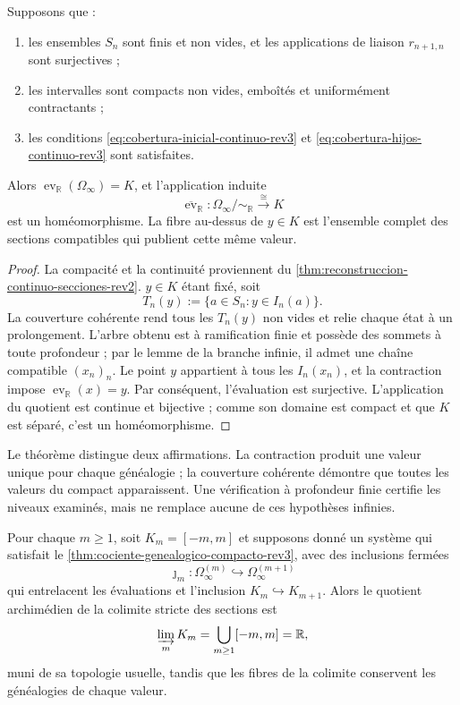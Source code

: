 \begin{theorem}
\label{thm:cociente-genealogico-compacto-rev3}
Supposons que :
\begin{enumerate}
\item les ensembles \(S_n\) sont finis et non vides, et les applications de liaison
      \(r_{n+1,n}\) sont surjectives ;
\item les intervalles sont compacts non vides, emboîtés et uniformément
      contractants ;
\item les conditions
      \eqref{eq:cobertura-inicial-continuo-rev3} et
      \eqref{eq:cobertura-hijos-continuo-rev3} sont satisfaites.
\end{enumerate}
Alors \(\operatorname{ev}_{\mathbb R}(\Omega_\infty)=K\), et l'application
induite
\begin{equation}
 \overline{\operatorname{ev}}_{\mathbb R}:
 \Omega_\infty/\!\sim_{\mathbb R}\xrightarrow{\ \cong\ }K
 \label{eq:homeomorfismo-cociente-continuo-rev3}
\end{equation}
est un homéomorphisme. La fibre au-dessus de \(y\in K\) est l'ensemble complet des
sections compatibles qui publient cette même valeur.
\end{theorem}

\begin{proof}
La compacité et la continuité proviennent du
\cref{thm:reconstruccion-continuo-secciones-rev2}. \(y\in K\) étant fixé, soit
\[
 T_n(y):=\{a\in S_n:y\in I_n(a)\}.
\]
La couverture cohérente rend tous les \(T_n(y)\) non vides et relie chaque
état à un prolongement. L'arbre obtenu est à ramification finie et
possède des sommets à toute profondeur ; par le lemme de la branche infinie, il admet une
chaîne compatible \((x_n)_n\). Le point \(y\) appartient à tous les
\(I_n(x_n)\), et la contraction impose
\(\operatorname{ev}_{\mathbb R}(x)=y\). Par conséquent, l'évaluation est
surjective. L'application du quotient est continue et bijective ; comme son
domaine est compact et que \(K\) est séparé, c'est un homéomorphisme.
\end{proof}

Le théorème distingue deux affirmations. La contraction produit une valeur unique
pour chaque généalogie ; la couverture cohérente démontre que toutes les valeurs
du compact apparaissent. Une vérification à profondeur finie certifie les
niveaux examinés, mais ne remplace aucune de ces hypothèses infinies.

\begin{proposition}
\label{prop:atlas-genealogico-recta-real-rev3}
Pour chaque \(m\geq1\), soit \(K_m=[-m,m]\) et supposons donné un système qui
satisfait le \cref{thm:cociente-genealogico-compacto-rev3}, avec des
inclusions fermées
\[
 \jmath_m:\Omega_\infty^{(m)}\hookrightarrow\Omega_\infty^{(m+1)}
\]
qui entrelacent les évaluations et l'inclusion
\(K_m\hookrightarrow K_{m+1}\). Alors le quotient archimédien de la
colimite stricte des sections est
\[
 \varinjlim_m K_m=\bigcup_{m\geq1}[-m,m]=\mathbb R,
\]
muni de sa topologie usuelle, tandis que les fibres de la colimite conservent les
généalogies de chaque valeur.
\end{proposition}

